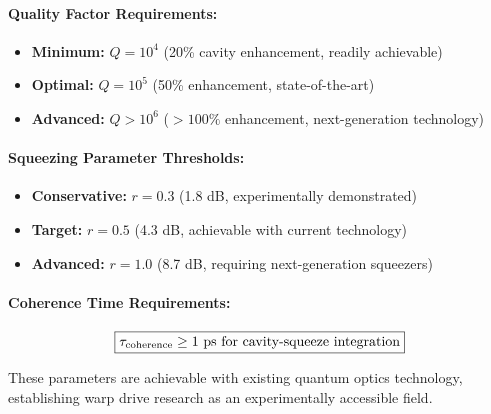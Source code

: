 \documentclass[11pt]{article}
\begin{document}
\paragraph{Quality Factor Requirements:}
\begin{itemize}
  \item \textbf{Minimum:} $Q = 10^4$ (20\% cavity enhancement, readily achievable)
  \item \textbf{Optimal:} $Q = 10^5$ (50\% enhancement, state-of-the-art)
  \item \textbf{Advanced:} $Q > 10^6$ ($>100\%$ enhancement, next-generation technology)
\end{itemize}

\paragraph{Squeezing Parameter Thresholds:}
\begin{itemize}
  \item \textbf{Conservative:} $r = 0.3$ (1.8 dB, experimentally demonstrated)
  \item \textbf{Target:} $r = 0.5$ (4.3 dB, achievable with current technology)
  \item \textbf{Advanced:} $r = 1.0$ (8.7 dB, requiring next-generation squeezers)
\end{itemize}

\paragraph{Coherence Time Requirements:}
\[
  \boxed{\tau_{\rm coherence} \geq 1\text{ ps for cavity-squeeze integration}}
\]

These parameters are achievable with existing quantum optics technology, establishing warp drive research as an experimentally accessible field.
\end{document}
